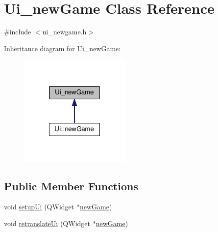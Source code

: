 \hypertarget{classUi__newGame}{\section{Ui\-\_\-new\-Game Class Reference}
\label{classUi__newGame}
}


{\ttfamily \#include $<$ui\-\_\-newgame.\-h$>$}



Inheritance diagram for Ui\-\_\-new\-Game\-:\nopagebreak
\begin{figure}[H]
\begin{center}
\leavevmode
\includegraphics[width=156pt]{classUi__newGame__inherit__graph}
\end{center}
\end{figure}
\subsection*{Public Member Functions}
\begin{DoxyCompactItemize}
\item 
void \hyperlink{classUi__newGame_a459a03fafdb92eba1cd159894327f3a3}{setup\-Ui} (Q\-Widget $\ast$\hyperlink{classnewGame}{new\-Game})
\item 
void \hyperlink{classUi__newGame_a40429a3444ab2b7e34982c6213f36a3b}{retranslate\-Ui} (Q\-Widget $\ast$\hyperlink{classnewGame}{new\-Game})
\end{DoxyCompactItemize}
